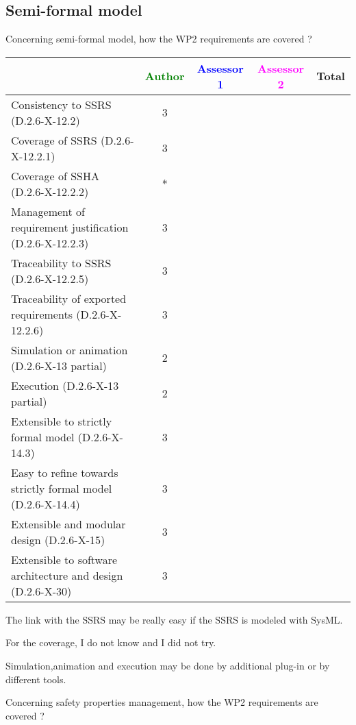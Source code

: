 \subsection{Semi-formal model}

Concerning semi-formal model, how the WP2 requirements are covered ?

\begin{tabular}{|l | c | c | c | c|}
\hline
& \textcolor{green}{Author} & \textcolor{blue}{Assessor 1} & \textcolor{magenta}{Assessor 2} & Total \\
\hline 
Consistency to SSRS (D.2.6-X-12.2) &3 & & &  \\
\hline
Coverage of SSRS (D.2.6-X-12.2.1)  &3 & & &  \\
\hline
Coverage of SSHA (D.2.6-X-12.2.2)  & * & & &  \\
\hline
Management of requirement justification (D.2.6-X-12.2.3)  &3 & & &  \\
\hline
Traceability to  SSRS (D.2.6-X-12.2.5)  & 3 & & &  \\
\hline
Traceability of exported requirements (D.2.6-X-12.2.6)  &3 & & &  \\
\hline
Simulation or animation (D.2.6-X-13 partial)  &2 & & &  \\
\hline
Execution (D.2.6-X-13 partial)  &2 & & &  \\
\hline
Extensible to strictly formal model (D.2.6-X-14.3) &3 & & &  \\
\hline
Easy to  refine towards strictly formal model (D.2.6-X-14.4) &3 & & &  \\
\hline
Extensible and modular design (D.2.6-X-15)  &3 & & &  \\
\hline
Extensible to software architecture and design (D.2.6-X-30)   &3 & & &  \\
\hline
\end{tabular}
\begin{author_comment}
The link with the SSRS may be really easy if the SSRS is modeled
with SysML.

For the coverage, I do not know and I did not try.


Simulation,animation  and execution may be done by additional plug-in
or by different tools.
\end{author_comment}
Concerning safety properties management, how the WP2 requirements are covered ?

